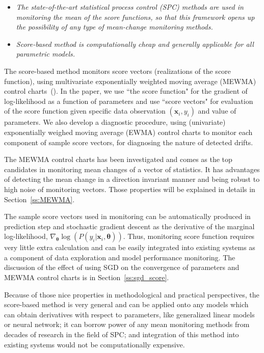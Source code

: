 \documentclass[twoside,11pt]{article}
\begin{document}
\begin{itemize}
\item
\textit{The state-of-the-art statistical process control (SPC) methods are used in monitoring the mean of the score functions, so that this framework opens up the possibility of any type of mean-change monitoring methods.}
\item
\textit{Score-based method is computationally cheap and generally applicable for all parametric models.}
\end{itemize}

The score-based method monitors score vectors (realizations of the score function), using multivariate exponentially weighted moving average (MEWMA) control charts~(\cite{montgomery2007introduction}). In the paper, we use ``the score function" for the gradient of log-likelihood as a function of parameters and use ``score vectors" for evaluation of the score function given specific data observation $(\bm {x}_i,y_i)$ and value of parameters. {We also develop a diagnostic procedure, using (univariate) exponentially weighed moving average (EWMA) control charts to monitor each component of sample score vectors, for diagnosing the nature of detected drifts.}

The MEWMA control charts has been investigated and comes as the top candidates in monitoring mean changes of a vector of statistics. It has advantages of detecting the mean change in a direction invariant manner and being robust to high noise of monitoring vectors. Those properties will be explained in details in Section~\ref{ss:MEWMA}.

The sample score vectors used in monitoring can be automatically produced in prediction step and stochastic gradient descent as the derivative of the marginal log-likelihood, {$\nabla _{\bm { \theta}} \log(P (y_i|\bm {x}_i, \bm { \theta}))$}. Thus, monitoring score function requires very little extra calculation and can be easily integrated into existing systems as a component of data exploration and model performance monitoring. The discussion of the effect of using SGD on the convergence of parameters and MEWMA control charts is in Section~\ref{ss:sgd_score}.

Because of those nice properties in methodological and practical perspectives, the score-based method is very general and can be applied onto any models which can obtain derivatives with respect to parameters, like generalized linear models or neural network; it can borrow power of any mean monitoring methods from decades of research in the field of SPC; and integration of this method into existing systems would not be computationally expensive. 
\end{document}
